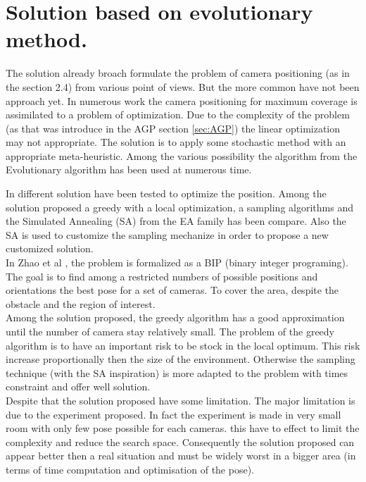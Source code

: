 	
	\section{Solution based on evolutionary  method.} 
	
	The solution already broach formulate the problem of camera positioning (as in the section 2.4) from various point of views. But the more common have not been approach yet.
In numerous work the camera positioning for maximum coverage is assimilated to a problem of optimization. Due to the complexity of the problem (as that was introduce in the AGP section \ref{sec:AGP}) the linear optimization may not appropriate.  
The solution is to apply some stochastic method with an appropriate meta-heuristic. Among the various possibility the algorithm from the Evolutionary algorithm has been used at numerous time. 

In \cite{151*zhao2013} different solution have been tested to optimize the position. Among the solution proposed a greedy with a local optimization,  a sampling algorithms and the Simulated Annealing (SA) from the EA family has been compare.  Also the SA is used to customize the sampling mechanize in order to propose a new customized solution. \\
In Zhao et al \cite{151*zhao2013}, the problem is formalized as a BIP (binary integer programing). %
  The goal is to find among a restricted numbers of possible positions and orientations the best pose for a set of cameras. To cover the area, despite the obstacle and the region of interest. \\
Among the solution proposed, the greedy algorithm has a good approximation until the number of camera stay relatively small. The problem of the greedy algorithm is to have an important risk to be stock in the local optimum. This risk increase proportionally then the size of the environment. Otherwise the sampling technique (with the SA inspiration) is more adapted to the problem with times constraint and offer well solution.\\
Despite that the solution proposed have some limitation. The major limitation is due to the experiment proposed. In fact the experiment is made in very small room with only few pose possible  for each cameras. this  have to effect to limit the complexity and reduce the search space. Consequently the solution proposed can appear better then a real situation and must be widely worst in a bigger area (in terms of time computation and  optimisation of the pose).\\

